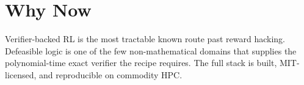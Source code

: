 \documentclass[11pt]{article}
\begin{document}
\section*{Why Now}

Verifier-backed RL is the most tractable known route past reward hacking. Defeasible logic is one of the few non-mathematical domains that supplies the polynomial-time exact verifier the recipe requires. The full stack is built, MIT-licensed, and reproducible on commodity HPC.
\end{document}
